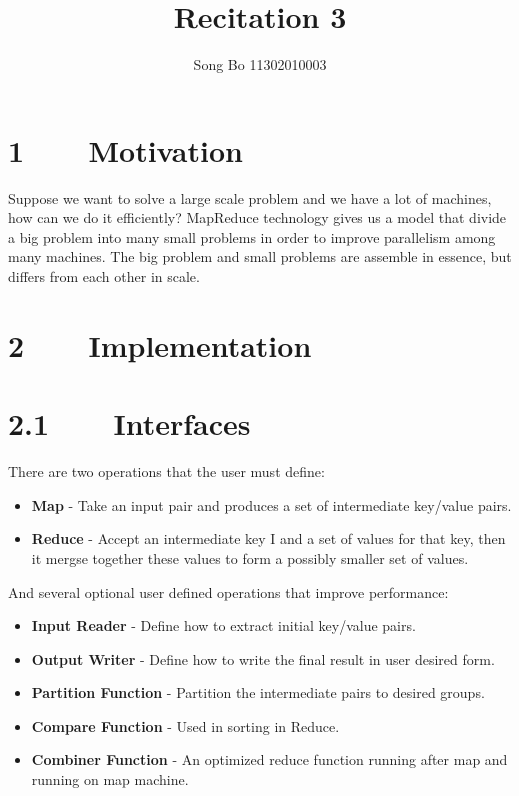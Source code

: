 \documentclass[12pt]{article}
\title{Recitation 3}
\author{Song Bo 11302010003}
\begin{document}
 
  \maketitle 
 \section*{1~~~~Motivation}
 Suppose we want to solve a large scale problem and we have a lot of machines, how can we do it efficiently? MapReduce technology gives us a model that divide a big problem into many small problems in order to improve parallelism among many machines. The big problem and small problems are assemble in essence, but differs from each other in  scale.
 \section*{2~~~~Implementation}
 \section*{2.1~~~~Interfaces}
 There are two operations that the user must define:
 \begin{itemize}
 \item \textbf{Map} - Take an input pair and produces a set of intermediate key/value pairs.
 \item \textbf{Reduce} - Accept an intermediate key I and a set of values for that key, then it mergse together these values to form a possibly smaller set of values.
 \end{itemize}
 And several optional user defined operations that improve performance:
 \begin{itemize}
 \item \textbf{Input Reader} - Define how to extract initial key/value pairs.
 \item \textbf{Output Writer} - Define how to write the final result in user desired form.
 \item \textbf{Partition Function} - Partition the intermediate pairs to desired groups.
 \item \textbf{Compare Function} - Used in sorting in Reduce.
 \item \textbf{Combiner Function} - An optimized reduce function running after map and running on map machine.
 \end{itemize}
\end{document}
